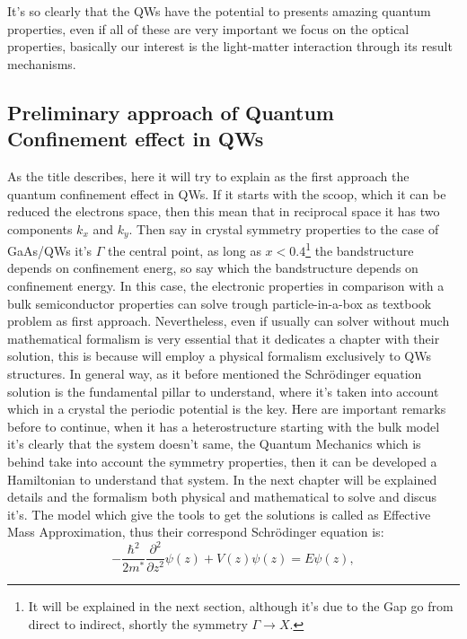 It's so clearly  that the QWs have the potential to presents amazing quantum properties, even if all of these are very important we focus on the optical properties, basically our interest is the light-matter interaction through its result mechanisms.  
 
\subsection{Preliminary approach of Quantum Confinement effect in QWs}
\vspace{-10mm} 
As the title describes, here it will try to explain as the first  approach the quantum confinement effect in QWs. If  it starts with the  scoop, which it can be reduced the electrons space, then this mean that in reciprocal space it has two components $k_{x}$ and $k_{y}$. Then say in crystal symmetry properties to the case of GaAs/\algaas QWs it's $\Gamma$ the central point, as long as $x < 0.4$\footnote{It will be explained in the next section, although it's due to the Gap go from direct to indirect, shortly the symmetry $\Gamma\to X$.} the bandstructure depends on confinement energ, so say which the bandstructure depends on confinement energy.  
In this case, the electronic properties in comparison with a bulk semiconductor properties can solve trough particle-in-a-box as textbook problem as first approach. Nevertheless, even if usually can solver without much mathematical formalism is very essential that it dedicates a chapter with their solution, this is because will employ a physical formalism exclusively to QWs structures. In general way, as it before mentioned the Schrödinger equation solution is the fundamental pillar to understand, where it's taken into account which  in a crystal the periodic potential is the key. Here are important remarks before to continue, when it has a heterostructure starting with the bulk model it's clearly that the system doesn't same, the Quantum Mechanics which is behind take into account the symmetry properties, then it can be developed a Hamiltonian  to understand that system.  In the next chapter will be explained details and the formalism both physical and mathematical to solve and discus it's. The model which give the tools to get the solutions is called as Effective Mass Approximation, thus their correspond Schrödinger equation is\cite{harrison2016quantum,chuang1995physics,singh2003electronic,bastard1990wave,fox2002optical,davies1998physics}: 
\begin{equation}\label{eq:chapter-1-ema-schroedinger}
	-\dfrac{\hbar^{2}}{2m^{*}}\dfrac{\partial^{2}}{\partial {z}^{2}}\psi(z)+V(z)\psi(z)=E\psi(z),
\end{equation}

